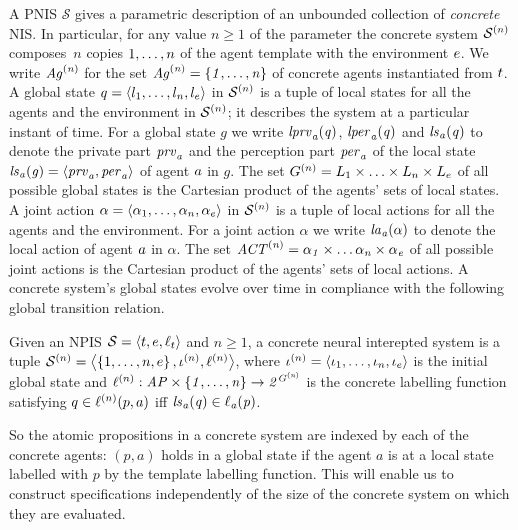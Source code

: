 A PNIS $\mathcal S$ gives a  parametric description of an unbounded collection
of {\em concrete} NIS. In particular, for any value $n \geq 1$ of the parameter
the concrete system $\mathcal{S}^{(n)}$ composes~$n$ copies ${1}, \ldots, {n}$ of the
agent template with the environment ${e}$. We write $\it{Ag}^{(n)}$ for the set
$\it{Ag}^{(n)} = \left \{ {1}, \ldots, {n} \right \}$ of concrete agents instantiated from ${t}$.   A global state $q = \left \langle l_{1}, \ldots, l_{n}, l_{e} \right \rangle$ in
$\mathcal{S}^{(n)}$ is a tuple of local states for all the agents and the environment in
$\mathcal{S}^{(n)}$; it describes the system at a particular instant of time.  For a global
state $g$ we write $\it{lprv}_{a}(q)$, $\it{lper}_{a}(q)$ and $\it{ls}_{a}(q)$ to denote the
private part $\it{prv}_{a}$ and the perception part $\it{per}_{a}$ of the local state
$\it{ls}_{a}(g) = \left \langle \it{prv}_{a}, \it{per}_{a} \right \rangle$ of agent ${a}$ in $g$.  The set
$G^{(n)} = L_{1} \times \ldots \times L_{n} \times L_e$ of all
possible global states is the Cartesian product of the agents’ sets of local
states.  A joint action $\alpha = \left \langle \alpha_1, \ldots, \alpha_n, \alpha_e \right \rangle$
in $\mathcal{S}^{(n)}$ is a tuple of local actions for all the agents and the environment.
For a joint action $\alpha$ we write $\it{la}_{a}({\alpha})$ to denote the local action
of agent ${a}$ in $\alpha$.  The set $\it{ACT}^{(n)} = \it{\alpha}_{1} \times \ldots \it{\alpha}_{n}
\times \it{\alpha}_{e}$ of all possible joint actions is the Cartesian product of the
agents’ sets of local actions.  A concrete system's global states evolve over
time in compliance with the following global transition relation.


\begin{definition}
  \label{def:concreteystem}
Given an NPIS $\mathcal S = \left \langle {t}, {e}, \ell_t \right \rangle$ and $n \geq 1$, a
concrete neural interepted system is a tuple $\mathcal{S}^{(n)} = \left \langle  \left \{ {1},
\ldots, {n}, {e} \right \}, \iota^{({n})}, \ell^{(n)} \right \rangle$, where $\iota^{({n})} =
\left \langle \iota_{1}, \ldots, \iota_{n}, \iota_{e} \right \rangle$ is the initial global state and
$\ell^{(n)} :  \it{AP} \times \left \{ 1, \ldots, n  \right \} \rightarrow 2^{G^{(n)}}$ is the concrete labelling function satisfying $q \in \ell^{(n)}(p,a)$ iff
$\it{ls}_{a}(q) \in \ell_{a}(p)$.
\end{definition}

So the atomic propositions in a concrete system are indexed by each of the
concrete agents: $(p, a)$ holds in a global state if the agent $a$ is at a local
state labelled with $p$ by the template labelling function. This will enable us
to construct specifications independently of the size of the concrete system on
which they are evaluated.

